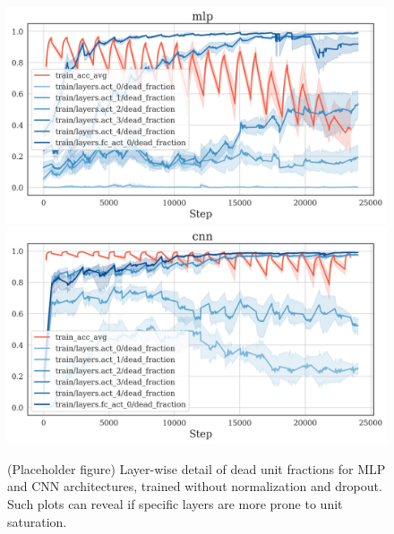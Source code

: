 \documentclass{article}
\begin{document}
\begin{figure}[h!]
    \centering
    \includegraphics[width=0.45\linewidth]{dead_frac_mlp_layer_detail.png}
    \includegraphics[width=0.45\linewidth]{dead_frac_cnn_layer_detail.png}
    \caption{(Placeholder figure) Layer-wise detail of dead unit fractions for MLP and CNN architectures, trained without normalization and dropout. Such plots can reveal if specific layers are more prone to unit saturation.}
    \label{fig:DeadReLUs-LayerDetail}
\end{figure}
\newpage

\end{document}
